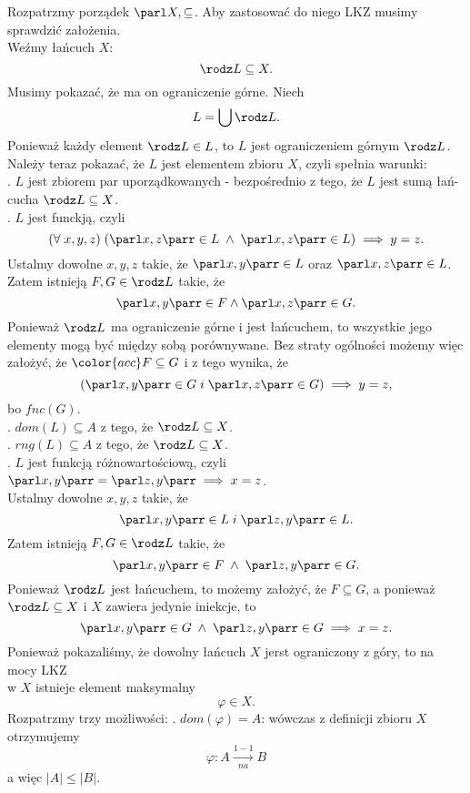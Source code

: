 Rozpatrzmy porządek $\parl X, \subseteq$. Aby zastosować do niego LKZ musimy sprawdzić założenia. \\Weźmy łańcuch $X$:
$$\rodz L\subseteq X.$$
Musimy pokazać, że ma on ograniczenie górne. Niech
$$L=\bigcup \rodz L.$$
Ponieważ każdy element $\rodz L\in L$, to $L$ jest ograniczeniem górnym $\rodz L$.\medskip\\
Należy teraz pokazać, że $L$ jest elementem zbioru $X$, czyli spełnia warunki:\smallskip\\
. {\color{emp}$L$ jest zbiorem par uporządkowanych} - bezpośrednio z tego, że $L$ jest sumą łań-\\cucha $\rodz L\subseteq X$.\smallskip\\
. {\color{emp}$L$ jest funckją,} czyli
$$(\forall\;x,y,z)\;(\parl x, z\parr\in L\;\land\;\parl x, z\parr\in L)\implies y=z.$$
Ustalmy dowolne $x, y, z$ takie, że $\parl x,y\parr\in L$ oraz $\parl x, z\parr\in L$. Zatem istnieją $F, G\in \rodz L$ takie, że
$$\parl x, y\parr\in F\land\parl x, z\parr\in G.$$
Ponieważ $\rodz L$ ma {\color{acc}ograniczenie górne i jest łańcuchem}, to wszystkie jego elementy mogą być między sobą porównywane. Bez straty ogólności możemy więc założyć, że $\color{acc}F\subseteq G$ i z tego wynika, że
$$(\parl x, y\parr\in G\;i\;\parl x, z\parr\in G)\implies y=z,$$
bo $fnc(G)$.\smallskip\\
. {\color{emp}$dom(L)\subseteq A$} z tego, że $\rodz L\subseteq X$.\smallskip\\
. {\color{emp}$rng(L)\subseteq A$} z tego, że $\rodz L\subseteq X$.\smallskip\\
. {\color{emp}$L$ jest funkcją różnowartościową,} czyli $\parl x, y\parr=\parl z, y\parr\implies x=z$.\smallskip\\
Ustalmy dowolne $x, y, z$ takie, że 
$$\parl x,y\parr\in L \; i \; \parl z,y\parr\in L.$$
Zatem istnieją $F, G\in \rodz L$ takie, że
$$\parl x,y\parr\in F\;\land\;\parl z,y\parr\in G.$$
Ponieważ $\rodz L$ jest łańcuchem, to możemy założyć, że $F\subseteq G$, a ponieważ $\rodz L\subseteq X$ i $X$ zawiera jedynie iniekcje, to
$$\parl x,y\parr\in G\;\land\;\parl z,y\parr\in G\implies x=z.$$
Ponieważ pokazaliśmy, że {\color{acc}dowolny łańcuch $X$ jerst ograniczony z góry, to na mocy LKZ \\w $X$ istnieje element maksymalny}
$$\varphi\in X.$$
Rozpatrzmy trzy możliwości:
. {\color{emp}$dom(\varphi)=A$:} wówczas z definicji zbioru $X$ otrzymujemy 
$$\varphi : A\xrightarrow[na]{1-1} B$$
a więc $|A|\leq|B|$.\smallskip\\
